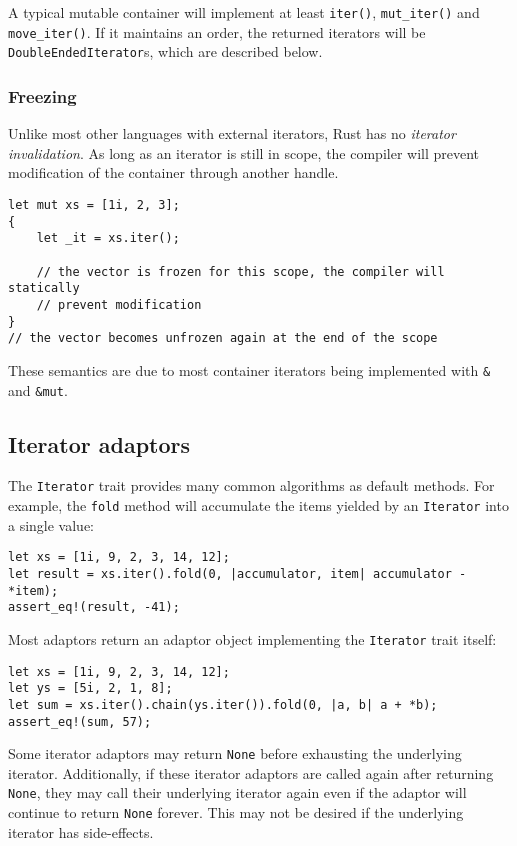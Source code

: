 \documentclass[]{article}
\begin{document}
A typical mutable container will implement at least \texttt{iter()},
\texttt{mut\_iter()} and \texttt{move\_iter()}. If it maintains an
order, the returned iterators will be \texttt{DoubleEndedIterator}s,
which are described below.

\subsubsection{Freezing}\label{freezing}

Unlike most other languages with external iterators, Rust has no
\emph{iterator invalidation}. As long as an iterator is still in scope,
the compiler will prevent modification of the container through another
handle.

\begin{verbatim}
let mut xs = [1i, 2, 3];
{
    let _it = xs.iter();

    // the vector is frozen for this scope, the compiler will statically
    // prevent modification
}
// the vector becomes unfrozen again at the end of the scope
\end{verbatim}

These semantics are due to most container iterators being implemented
with \texttt{\&} and \texttt{\&mut}.

\subsection{Iterator adaptors}\label{iterator-adaptors}

The \texttt{Iterator} trait provides many common algorithms as default
methods. For example, the \texttt{fold} method will accumulate the items
yielded by an \texttt{Iterator} into a single value:

\begin{verbatim}
let xs = [1i, 9, 2, 3, 14, 12];
let result = xs.iter().fold(0, |accumulator, item| accumulator - *item);
assert_eq!(result, -41);
\end{verbatim}

Most adaptors return an adaptor object implementing the
\texttt{Iterator} trait itself:

\begin{verbatim}
let xs = [1i, 9, 2, 3, 14, 12];
let ys = [5i, 2, 1, 8];
let sum = xs.iter().chain(ys.iter()).fold(0, |a, b| a + *b);
assert_eq!(sum, 57);
\end{verbatim}

Some iterator adaptors may return \texttt{None} before exhausting the
underlying iterator. Additionally, if these iterator adaptors are called
again after returning \texttt{None}, they may call their underlying
iterator again even if the adaptor will continue to return \texttt{None}
forever. This may not be desired if the underlying iterator has
side-effects.
\end{document}
